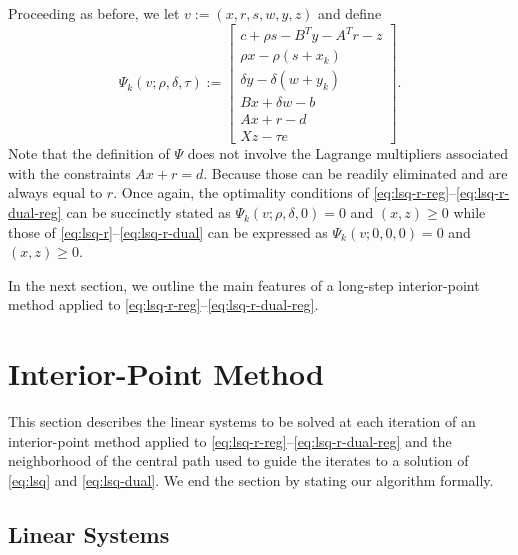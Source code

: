 \documentclass{amsart}
\begin{document}
Proceeding as before, we let $v := (x, r, s, w, y, z)$ and define
\begin{equation}
  \label{eq:def-psi}
  \Psi_k(v; \rho, \delta, \tau) :=
  \begin{bmatrix}
    c + \rho s - B^T y - A^T r - z \\
    \rho x - \rho (s + x_k) \\
    \delta y - \delta (w + y_k) \\
    Bx + \delta w - b \\
    Ax + r - d \\
    Xz - \tau e
  \end{bmatrix}.
\end{equation}
Note that the definition of $\Psi$ does not involve the Lagrange multipliers
associated with the constraints $Ax + r = d$. Because those can be
readily eliminated and are always equal to $r$. Once again, the optimality
conditions of \eqref{eq:lsq-r-reg}--\eqref{eq:lsq-r-dual-reg} can be succinctly
stated as $\Psi_k(v; \rho, \delta, 0) = 0$ and $(x, z) \geq 0$ while
those of \eqref{eq:lsq-r}--\eqref{eq:lsq-r-dual} can be expressed as
$\Psi_k(v; 0, 0, 0) = 0$ and $(x, z) \geq 0$.

In the next section, we outline the main features of a long-step interior-point
method applied to \eqref{eq:lsq-r-reg}--\eqref{eq:lsq-r-dual-reg}.

\section{Interior-Point Method}

This section describes the linear systems to be solved at each iteration of an
interior-point method applied to
\eqref{eq:lsq-r-reg}--\eqref{eq:lsq-r-dual-reg} and the neighborhood of the
central path used to guide the iterates to a solution of \eqref{eq:lsq} and
\eqref{eq:lsq-dual}. We end the section by stating our algorithm formally.

\subsection{Linear Systems}
\end{document}
